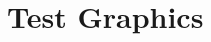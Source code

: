 \documentclass[10pt]{article}
\begin{document}
\section{Test Graphics}

\begin{figure}[h]
	\centering
\fbox{\rule{0pt}{2in} \rule{0.3\linewidth}{0pt}} 
\fbox{\rule{0pt}{2in} \rule{0.3\linewidth}{0pt}}
\end{figure}
\end{document}
